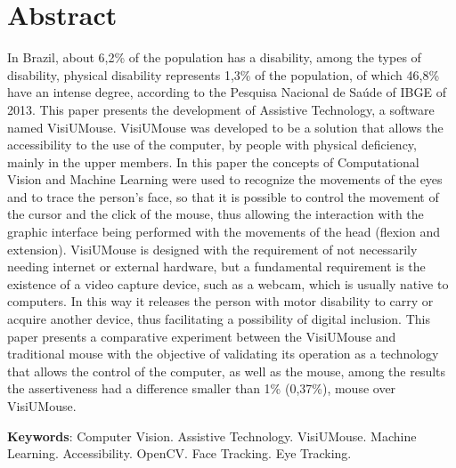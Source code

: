 \chapter*{Abstract}
\begin{singlespace}
{\fontsize{12pt}{\baselineskip} \selectfont \noindent
In Brazil, about 6,2\% of the population has a disability, among the types of disability, physical disability represents 1,3\% of the population, of which 46,8\% have an intense degree, according to the Pesquisa  Nacional de Saúde of IBGE of 2013. This paper presents the development of Assistive Technology, a software named VisiUMouse. VisiUMouse was developed to be a solution that allows the accessibility to the use of the computer, by people with physical deficiency, mainly in the upper members. In this paper the concepts of Computational Vision and Machine Learning were used to recognize the movements of the eyes and to trace the person's face, so that it is possible to control the movement of the cursor and the click of the mouse, thus allowing the interaction with the graphic interface being performed with the movements of the head (flexion and extension). VisiUMouse is designed with the requirement of not necessarily needing internet or external hardware, but a fundamental requirement is the existence of a video capture device, such as a webcam, which is usually native to computers. In this way it releases the person with motor disability to carry or acquire another device, thus facilitating a possibility of digital inclusion. This paper presents a comparative experiment between the VisiUMouse and traditional mouse with the objective of validating its operation as a technology that allows the control of the computer, as well as the mouse, among the results the assertiveness had a difference smaller than 1\% (0,37\%), mouse over VisiUMouse.

}
\end{singlespace}

\begin{singlespace}
\noindent \onehalfspacing
\textbf{Keywords}: Computer Vision. Assistive Technology. VisiUMouse. Machine Learning. Accessibility. OpenCV. Face Tracking. Eye Tracking.
\end{singlespace}